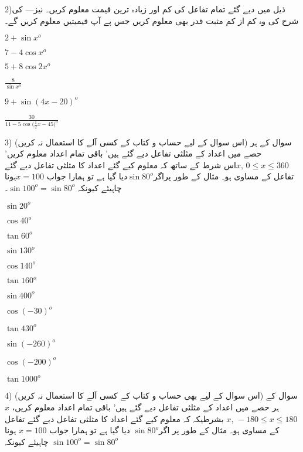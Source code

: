 2)ذیل میں دیے گئے تمام تفاعل کی کم اور زیادہ ترین قیمت معلوم کریں۔ نیز--- کی شرح کی وہ کم از کم مثبت قدر بھی معلوم کریں جس پے آپ قیمیتیں معلوم کریں گے۔
\begin{enumerate}[aـ]
\begin{multicols}{2}
\item \( 2+\sin x^o \)
\item \(7-4\cos x^o\)
\item \( 5+8 \cos 2x^o\)
\item \( \frac{8}{\sin x^o}\)
\item \( 9+\sin (4x-20)^o\)
\item \( \frac{30}{11-5\cos \big( \frac{1}{2}x -45\big)^o}\)
\end{multicols}
\end{enumerate}
3) (اس سوال کے لیے حساب و کتاب کے کسی آلے کا استعمال نہ کریں) سوال کے ہر حصے میں اعداد کے مثلثی تفاعل دیے گئے ہیں' باقی تمام اعداد معلوم کریں' \(x,\, 0\leq x \leq 360\)اس شرط کے ساتھ کہ معلوم کیے گئے اعداد کا مثلثی تفاعل دیے گئے تفاعل کے مساوی ہو۔ مثال کے طور پراگر\(\sin 80^o\)دیا گیا ہے تو ہمارا جواب \(x=100\)ہونا چاہیئے کیونکہ \(\sin 100^o =\sin 80^o\)۔
\begin{enumerate}[aـ]
\begin{multicols}{4}
\item \(\sin 20^o\)
\item \(\cos 40^o\)
\item \(\tan 60^o\)
\item \(\sin 130^o\)
\item \(\cos 140^o\)
\item \(\tan 160^o\)
\item \(\sin 400^o\)
\item \(\cos (-30)^o\)
\item \(\tan 430^o\)
\item \(\sin (-260)^o\)
\item \(\cos (-200)^o\)
\item \(\tan 1000^o\)
\end{multicols}
\end{enumerate}
4) (اس سوال کے لیے  بھی حساب و کتاب کے کسی آلے کا استعمال نہ کریں) سوال کے ہر حصے میں اعداد کے مثلثی تفاعل دیے گئے ہیں' باقی تمام اعداد معلوم کریں،  \(x\) \(x,\, -180\leq x \leq 180\) بشرطیکہ کہ معلوم کیے گئے اعداد کا مثلثی تفاعل دیے گئے تفاعل کے مساوی ہو۔ مثال کے طور پر اگر\(\sin 80^o\) دیا گیا ہے تو ہمارا جواب \(x=100\) ہونا چاہیئے کیونکہ \(\sin 100^o =\sin 80^o\)


